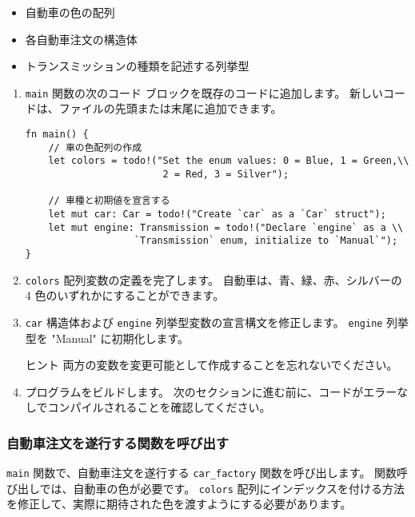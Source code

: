 \begin{itemize}
\item 自動車の色の配列
\item 各自動車注文の構造体
\item トランスミッションの種類を記述する列挙型
\end{itemize}

\begin{enumerate}
\item \texttt{main} 関数の次のコード ブロックを既存のコードに追加します。 新しいコードは、ファイルの先頭または末尾に追加できます。

\begin{lstlisting}[numbers=none]
fn main() {
    // 車の色配列の作成
    let colors = todo!("Set the enum values: 0 = Blue, 1 = Green,\\
                        2 = Red, 3 = Silver");

    // 車種と初期値を宣言する
    let mut car: Car = todo!("Create `car` as a `Car` struct");     
    let mut engine: Transmission = todo!("Declare `engine` as a \\
                   `Transmission` enum, initialize to `Manual`");
}
\end{lstlisting}

\item \texttt{colors} 配列変数の定義を完了します。 自動車は、青、緑、赤、シルバーの 4 色のいずれかにすることができます。

\item \texttt{car} 構造体および \texttt{engine} 列挙型変数の宣言構文を修正します。 \texttt{engine} 列挙型を "Manual" に初期化します。

\begin{itembox}[l]{ヒント}
両方の変数を変更可能として作成することを忘れないでください。
\end{itembox}

\item プログラムをビルドします。 次のセクションに進む前に、コードがエラーなしでコンパイルされることを確認してください。
\end{enumerate}


\subsubsection{自動車注文を遂行する関数を呼び出す}

\texttt{main} 関数で、自動車注文を遂行する \texttt{car\_factory} 関数を呼び出します。 関数呼び出しでは、自動車の色が必要です。 \texttt{colors} 配列にインデックスを付ける方法を修正して、実際に期待された色を渡すようにする必要があります。

